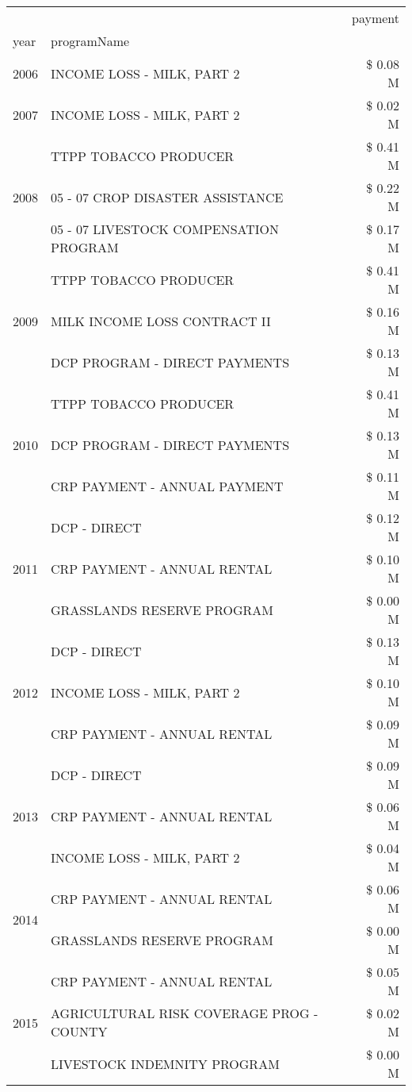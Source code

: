 \begin{tabular}{llr}
\toprule
 &  & payment \\
year & programName &  \\
\midrule
2006 & INCOME LOSS - MILK, PART 2 & \$ 0.08 M \\
\cline{1-3}
2007 & INCOME LOSS - MILK, PART 2 & \$ 0.02 M \\
\cline{1-3}
\multirow[t]{3}{*}{2008} & TTPP TOBACCO PRODUCER & \$ 0.41 M \\
 & 05 - 07 CROP DISASTER ASSISTANCE & \$ 0.22 M \\
 & 05 - 07 LIVESTOCK COMPENSATION PROGRAM & \$ 0.17 M \\
\cline{1-3}
\multirow[t]{3}{*}{2009} & TTPP TOBACCO PRODUCER & \$ 0.41 M \\
 & MILK INCOME LOSS CONTRACT II & \$ 0.16 M \\
 & DCP PROGRAM - DIRECT PAYMENTS & \$ 0.13 M \\
\cline{1-3}
\multirow[t]{3}{*}{2010} & TTPP TOBACCO PRODUCER & \$ 0.41 M \\
 & DCP PROGRAM - DIRECT PAYMENTS & \$ 0.13 M \\
 & CRP PAYMENT - ANNUAL PAYMENT & \$ 0.11 M \\
\cline{1-3}
\multirow[t]{3}{*}{2011} & DCP - DIRECT & \$ 0.12 M \\
 & CRP PAYMENT - ANNUAL RENTAL & \$ 0.10 M \\
 & GRASSLANDS RESERVE PROGRAM & \$ 0.00 M \\
\cline{1-3}
\multirow[t]{3}{*}{2012} & DCP - DIRECT & \$ 0.13 M \\
 & INCOME LOSS - MILK, PART 2 & \$ 0.10 M \\
 & CRP PAYMENT - ANNUAL RENTAL & \$ 0.09 M \\
\cline{1-3}
\multirow[t]{3}{*}{2013} & DCP - DIRECT & \$ 0.09 M \\
 & CRP PAYMENT - ANNUAL RENTAL & \$ 0.06 M \\
 & INCOME LOSS - MILK, PART 2 & \$ 0.04 M \\
\cline{1-3}
\multirow[t]{2}{*}{2014} & CRP PAYMENT - ANNUAL RENTAL & \$ 0.06 M \\
 & GRASSLANDS RESERVE PROGRAM & \$ 0.00 M \\
\cline{1-3}
\multirow[t]{3}{*}{2015} & CRP PAYMENT - ANNUAL RENTAL & \$ 0.05 M \\
 & AGRICULTURAL RISK COVERAGE PROG - COUNTY & \$ 0.02 M \\
 & LIVESTOCK INDEMNITY PROGRAM & \$ 0.00 M \\

\end{tabular}
